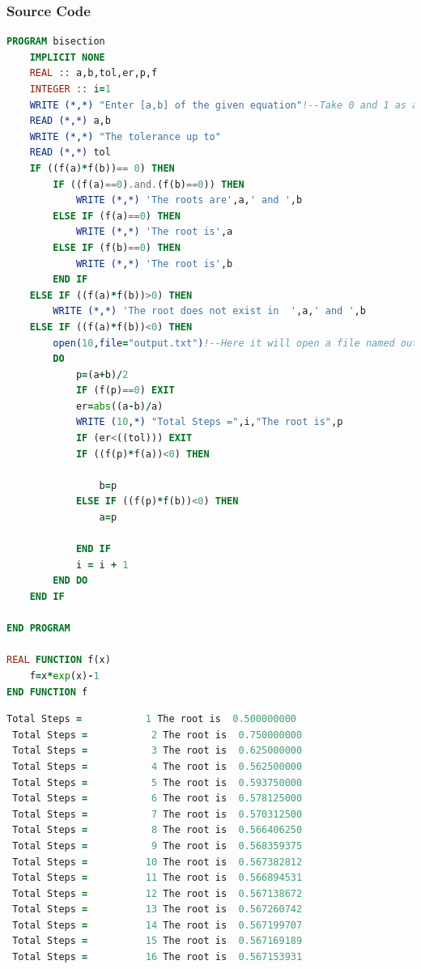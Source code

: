 \documentclass{article}
\begin{document}
\subsubsection{Source Code}
\begin{lstlisting}[language=Fortran,caption=Bisection Method]
PROGRAM bisection
    IMPLICIT NONE
    REAL :: a,b,tol,er,p,f
    INTEGER :: i=1
    WRITE (*,*) "Enter [a,b] of the given equation"!--Take 0 and 1 as a interval--!
    READ (*,*) a,b
    WRITE (*,*) "The tolerance up to"
    READ (*,*) tol
    IF ((f(a)*f(b))== 0) THEN
        IF ((f(a)==0).and.(f(b)==0)) THEN
            WRITE (*,*) 'The roots are',a,' and ',b
        ELSE IF (f(a)==0) THEN
            WRITE (*,*) 'The root is',a
        ELSE IF (f(b)==0) THEN
            WRITE (*,*) 'The root is',b
        END IF
    ELSE IF ((f(a)*f(b))>0) THEN
        WRITE (*,*) 'The root does not exist in  ',a,' and ',b
    ELSE IF ((f(a)*f(b))<0) THEN
        open(10,file="output.txt")!--Here it will open a file named output.txt--!
        DO
            p=(a+b)/2
            IF (f(p)==0) EXIT
            er=abs((a-b)/a)
            WRITE (10,*) "Total Steps =",i,"The root is",p
            IF (er<((tol))) EXIT
            IF ((f(p)*f(a))<0) THEN

                b=p
            ELSE IF ((f(p)*f(b))<0) THEN
                a=p

            END IF
            i = i + 1
        END DO
    END IF

END PROGRAM

REAL FUNCTION f(x)
    f=x*exp(x)-1
END FUNCTION f
\end{lstlisting}
\begin{lstlisting}[language=Fortran,caption=Bisection Method Output]
 Total Steps =           1 The root is  0.500000000    
 Total Steps =           2 The root is  0.750000000    
 Total Steps =           3 The root is  0.625000000    
 Total Steps =           4 The root is  0.562500000    
 Total Steps =           5 The root is  0.593750000    
 Total Steps =           6 The root is  0.578125000    
 Total Steps =           7 The root is  0.570312500    
 Total Steps =           8 The root is  0.566406250    
 Total Steps =           9 The root is  0.568359375    
 Total Steps =          10 The root is  0.567382812    
 Total Steps =          11 The root is  0.566894531    
 Total Steps =          12 The root is  0.567138672    
 Total Steps =          13 The root is  0.567260742    
 Total Steps =          14 The root is  0.567199707    
 Total Steps =          15 The root is  0.567169189    
 Total Steps =          16 The root is  0.567153931    

\end{lstlisting}
\newpage
\end{document}
